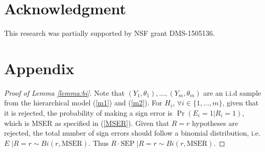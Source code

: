 \documentclass[11pt]{article}
\begin{document}
\section*{Acknowledgment} This research was partially supported by
NSF grant DMS-1505136. 

\section*{Appendix}


\begin{proof}[Proof of  Lemma \ref{lemma:bi}] 
	Note that $(Y_1, \theta_1),\ldots, (Y_m, \theta_m)$ are an i.i.d sample from the hierarchical  model (\ref{m1}) and (\ref{m2}). For $H_i$,  $\forall i \in \{1,..., m\} $, given that it is rejected, the probability of making a sign error is $\Pr(E_i = 1|R_i =1)$, which is MSER as specified in (\ref{MSER}).  Given that $R=r$ hypotheses are rejected, the total number of sign errors should follow a binomial distribution, i.e.
		$E\;| R=r \sim Bi(r,\text{MSER})$.
	Thus $
	R \cdot \text{SEP}\;| R=r \sim Bi(r,\text{MSER})$.
\end{proof}
\end{document}
